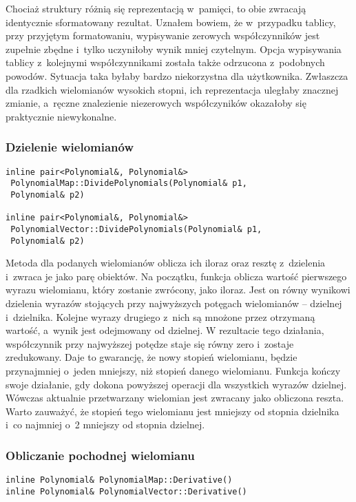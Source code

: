 Chociaż struktury różnią się reprezentacją w~pamięci, to obie zwracają identycznie sformatowany rezultat. Uznałem bowiem, że w~przypadku tablicy, przy przyjętym formatowaniu, wypisywanie zerowych współczynników jest zupełnie zbędne i~tylko uczyniłoby wynik mniej czytelnym. Opcja wypisywania tablicy z~kolejnymi współczynnikami została także odrzucona z~podobnych powodów. Sytuacja taka byłaby bardzo niekorzystna dla użytkownika. Zwłaszcza dla rzadkich wielomianów wysokich stopni, ich reprezentacja uległaby znacznej zmianie, a~ręczne znalezienie niezerowych współczyników okazałoby się praktycznie niewykonalne.

\subsubsection{Dzielenie wielomianów}
\begin{lstlisting}
inline pair<Polynomial&, Polynomial&>
 PolynomialMap::DividePolynomials(Polynomial& p1,
 Polynomial& p2)

inline pair<Polynomial&, Polynomial&>
 PolynomialVector::DividePolynomials(Polynomial& p1,
 Polynomial& p2)
\end{lstlisting}

Metoda dla podanych wielomianów oblicza ich iloraz oraz resztę z~dzielenia i~zwraca je jako parę obiektów. Na początku, funkcja oblicza wartość pierwszego wyrazu wielomianu, który zostanie zwrócony, jako iloraz. Jest on równy wynikowi dzielenia wyrazów stojących przy najwyższych potęgach wielomianów – dzielnej i~dzielnika. Kolejne wyrazy drugiego z~nich są mnożone przez otrzymaną wartość, a~wynik jest odejmowany od dzielnej. W rezultacie tego działania, współczynnik przy najwyższej potędze staje się równy zero i~zostaje zredukowany. Daje to gwarancję, że nowy stopień wielomianu, będzie przynajmniej o~jeden mniejszy, niż stopień danego wielomianu. Funkcja kończy swoje działanie, gdy dokona powyższej operacji dla wszystkich wyrazów dzielnej. Wówczas aktualnie przetwarzany wielomian jest zwracany jako obliczona reszta. Warto zauważyć, że stopień tego wielomianu jest mniejszy od stopnia dzielnika i~co najmniej o~2 mniejszy od stopnia dzielnej.

\subsubsection{Obliczanie pochodnej wielomianu}
\begin{lstlisting}
inline Polynomial& PolynomialMap::Derivative()
inline Polynomial& PolynomialVector::Derivative()
\end{lstlisting}

